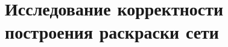 \documentclass[12pt]{article}
\begin{document}
\hfill
\begin{minipage}[H]{0.24\linewidth}
\end{minipage}

\section{Исследование корректности построения раскраски сети}
\end{document}
